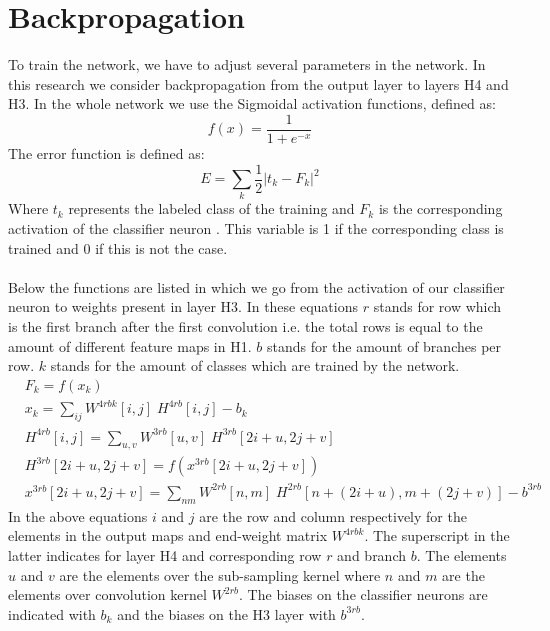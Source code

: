\documentclass[a4paper,onecolumn]{report}
\begin{document}
\section{Backpropagation}
\label{sec:BP}
To train the network, we have to adjust several parameters in the network. In this research we consider backpropagation from the output layer to layers H4 and H3. In the whole network we use the Sigmoidal activation functions, defined as:
\begin{equation}
f(x)=\frac{1}{1+e^{-x}} 
\end{equation}	
The error function is defined as:
\begin{equation}
E=\sum_{k} \frac{1}{2}|t_k-F_{k}|^{2}
\end{equation}
Where $t_k$ represents the labeled class of the training and $F_{k}$ is the corresponding activation of the classifier neuron . This variable is 1 if the corresponding class is trained and 0 if this is not the case. 
\\\\
Below the functions are listed in which we go from the activation of our classifier neuron to weights present in layer H3. In these equations $r$ stands for row which is the first branch after the first convolution i.e. the total rows is equal to the amount of different feature maps in H1. $b$ stands for the amount of branches per row. $k$ stands for the amount of classes which are trained by the network.
\begin{equation}
\begin{split}
	&F_{k}= f( x_{k}) \\
	& x_{k}=\sum_{ij} W^{4rbk}[i,j] \; H^{4rb}[i,j] - b_{k} \\
	&H^{4rb}[i,j]= \sum_{u,v} W^{3rb}[u,v] \; H^{3rb} [2i+u,2j+v] \\
	&H^{3rb} [2i+u,2j+v]= f\left (x^{3rb}[2i+u,2j+v] \right) \\
	&x^{3rb}[2i+u,2j+v]=\sum_{nm} W^{2rb}[n,m] \; H^{2rb}[n+(2i+u),m+(2j+v)] -b^{3rb}
\end{split}
\end{equation}
In the above equations $i$ and $j$ are the row and column respectively for the elements in the output maps and end-weight matrix $ W^{4rbk}$. The superscript in the latter indicates for layer H4 and corresponding row $r$ and branch $b$. The elements $u$ and $v$ are the elements over the sub-sampling kernel where $n$ and $m$ are the elements over convolution kernel $W^{2rb}$. The biases on the classifier neurons are indicated with $b_{k}$ and the biases on the H3 layer with $b^{3rb}$.
\end{document}
